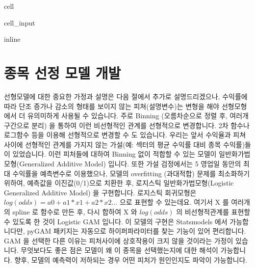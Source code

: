 \documentclass[letterpaper,10pt,english]{jupyterBook}
\begin{document}
\begin{sphinxuseclass}{cell}\begin{sphinxVerbatimInput}

\begin{sphinxuseclass}{cell_input}
\begin{sphinxVerbatim}[commandchars=\\\{\}]
   
 inline
   
   
   
 
 
  
\end{sphinxVerbatim}

\end{sphinxuseclass}\end{sphinxVerbatimInput}

\end{sphinxuseclass}

\section{종목 선정 모델 개발}
\label{\detokenize{chapter5/5.2.3_GAM:id1}}\label{\detokenize{chapter5/5.2.3_GAM::doc}}
\sphinxAtStartPar
선형모델에 대한 중요한 가정과 설명은 다음 절에서 추가로 설명드리겠으나,  수익률에 따라 단조 증가나 감소의 형태를 보이지 않는 피쳐(설명변수)는 변형을 해야 선형모형에서 더 유의미하게 사용될 수 있습니다.  주로 Binning (오름차순으로 정렬 후, 여러개 구간으로 분리) 을 통하여 이런 비선형적인 관계를 선형적으로 변경합니다. 2차 함수나 로그함수 등을 이용해 선형적으로 변경할 수 도 있습니다. 우리는 앞서 수익율과 피쳐사이에 선형적인 관계를 가지지 않는 가설(예: 섹터의 평균 수익률 대비 종목 수익률)들 이 있었습니다. 이런 피처들에 대하여 Binning 없이 적합할 수 있는 모델이 일반화가법모형(Generalized Additive Model) 입니다. 또한 가설 검정에서는 5 영업일 동안의 최대 수익률을 예측변수로 이용했으나, 모델의 overfitting (과대적합) 문제를 최소화하기 위하여, 예측값을 이진값(0/1)으로 치환한 후, 로지스틱 일반화가법모형(Logistic Generalized Additive Model) 을 구현합니다. 로지스틱 회귀모형은 \(log(odds) = a0 + a1*x1 + a2*x2 …\)  으로 표현할 수 있는데요. 여기서 X 를 여러개의 spline 로 함수로 만든 후, 다시 합하여 X 와 \(log(odds)\) 의  비선형적관계를 표현할 수 있도록 한 것이  Logistic GAM 입니다.  이 모델의 구현은 Statsmodels 에서 가능합니다만, pyGAM 패키지는 자동으로 하이퍼파라미터를 찾는 기능이 있어 편리합니다. GAM 을 선택한 다른 이유는 피처사이에 상호작용이 크지 않을 것이라는 가정이 있습니다. 무엇보다도 좋은 점은 모델이 왜 이 종목을 선택했는지에 대한 해석이 가능합니다. 향후, 모델의 예측력이 저하되는 경우 어떤 피처가 원인인지도 파악이 가능합니다.
\end{document}
